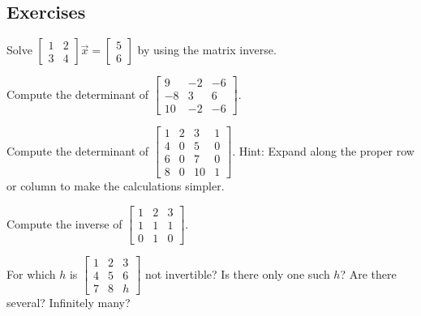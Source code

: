 \subsection{Exercises}

\begin{exercise}
Solve
$\left[ \begin{smallmatrix}
1 & 2 \\
3 & 4 
\end{smallmatrix} \right] \vec{x} =
\left[ \begin{smallmatrix}
5 \\
6
\end{smallmatrix} \right]$ by using the matrix inverse.
\end{exercise}

\begin{exercise}
Compute the determinant of
$\left[ \begin{smallmatrix}
9 & -2 & -6 \\
-8 & 3 & 6 \\
10 & -2 & -6
\end{smallmatrix} \right]$.
\end{exercise}

\begin{exercise}
Compute the determinant of
$\left[ \begin{smallmatrix}
1 & 2 & 3 & 1 \\
4 & 0 & 5 & 0 \\
6 & 0 & 7 & 0 \\
8 & 0 & 10 & 1
\end{smallmatrix} \right]$.  Hint: Expand along the proper row or column to
make the calculations simpler.
\end{exercise}

\begin{exercise}
Compute the inverse of
$\left[ \begin{smallmatrix}
1 & 2 & 3 \\
1 & 1 & 1 \\
0 & 1 & 0
\end{smallmatrix} \right]$.
\end{exercise}

\begin{exercise}
For which $h$ is
$\left[ \begin{smallmatrix}
1 & 2 & 3 \\
4 & 5 & 6 \\
7 & 8 & h
\end{smallmatrix} \right]$
not invertible?  Is there only one such $h$?  Are there several?  Infinitely
many?
\end{exercise}

